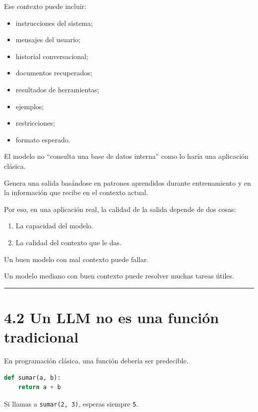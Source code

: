 Ese contexto puede incluir:

\begin{itemize}
\tightlist
\item
  instrucciones del sistema;
\item
  mensajes del usuario;
\item
  historial conversacional;
\item
  documentos recuperados;
\item
  resultados de herramientas;
\item
  ejemplos;
\item
  restricciones;
\item
  formato esperado.
\end{itemize}

El modelo no ``consulta una base de datos interna'' como lo haría una
aplicación clásica.

Genera una salida basándose en patrones aprendidos durante entrenamiento
y en la información que recibe en el contexto actual.

Por eso, en una aplicación real, la calidad de la salida depende de dos
cosas:

\begin{enumerate}
\def\labelenumi{\arabic{enumi}.}
\tightlist
\item
  La capacidad del modelo.
\item
  La calidad del contexto que le das.
\end{enumerate}

Un buen modelo con mal contexto puede fallar.

Un modelo mediano con buen contexto puede resolver muchas tareas útiles.

\begin{center}\rule{0.5\linewidth}{0.5pt}\end{center}

\section{4.2 Un LLM no es una función
tradicional}\label{un-llm-no-es-una-funciuxf3n-tradicional}

En programación clásica, una función debería ser predecible.

\begin{lstlisting}[language=Python]
def sumar(a, b):
    return a + b
\end{lstlisting}

Si llamas a \passthrough{\lstinline!sumar(2, 3)!}, esperas siempre
\passthrough{\lstinline!5!}.

